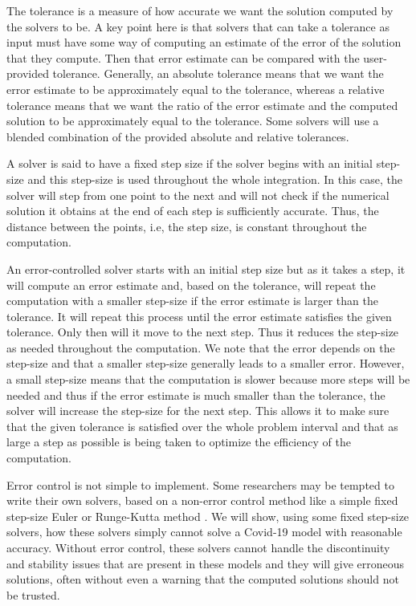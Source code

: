 The tolerance is a measure of how accurate we want the solution computed by the solvers to be. A key point here is that solvers that can take a tolerance as input must have some way of computing an estimate of the error of the solution that they compute. Then that error estimate can be compared with the user-provided tolerance. Generally, an absolute tolerance means that we want the error estimate to be approximately equal to the tolerance, whereas a relative tolerance means that we want the ratio of the error estimate and the computed solution to be approximately equal to the tolerance. Some solvers will use a blended combination of the provided absolute and relative tolerances.

A solver is said to have a fixed step size if the solver begins with an initial step-size and this step-size is used throughout the whole integration. In this case, the solver will step from one point to the next and will not check if the numerical solution it obtains at the end of each step is sufficiently accurate. Thus, the distance between the points, i.e, the step size, is constant throughout the computation.

An error-controlled solver starts with an initial step size but as it takes a step, it will compute an error estimate and, based on the tolerance, will repeat the computation with a smaller step-size if the error estimate is larger than the tolerance. It will repeat this process until the error estimate satisfies the given tolerance. Only then will it move to the next step. Thus it reduces the step-size as needed throughout the computation. We note that the error depends on the step-size and that a smaller step-size generally leads to a smaller error. However, a small step-size means that the computation is slower because more steps will be needed and thus if the error estimate is much smaller than the tolerance, the solver will increase the step-size for the next step. This allows it to make sure that the given tolerance is satisfied over the whole problem interval and that as large a step as possible is being taken to optimize the efficiency of the computation.

Error control is not simple to implement. Some researchers may be tempted to write their own solvers, based on a non-error control method like a simple fixed step-size Euler or Runge-Kutta method \cite{MR3822086}. We will show, using some fixed step-size solvers, how these solvers simply cannot solve a Covid-19 model with reasonable accuracy. Without error control, these solvers cannot handle the discontinuity and stability issues that are present in these models and they will give erroneous solutions, often without even a warning that the computed solutions should not be trusted.

